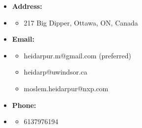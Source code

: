 \documentclass[12pt,oneside]{book}
\begin{document}
\begin {itemize}
\item  [] {\bf  Address:} \vspace{-1.5em}
\item []  {\bf \hrulefill } \vspace{-1em}
\begin {itemize} 
\item  \small 217 Big Dipper, Ottawa, ON, Canada
\end{itemize}  \vspace{0.5em}
\item  []  {\bf  Email:} \vspace{-1.5em}
\item []  {\bf \hrulefill } \vspace{-1em}
\begin {itemize} 
 \item  \small heidarpur.m@gmail.com (preferred)
 \item \small heidarp@uwindsor.ca
 \item \small moslem.heidarpur@nxp.com
\end {itemize}   \vspace{0.5em}
\item  []   {\bf Phone:} \vspace{-1.5em}
\item []  {\bf \hrulefill } \vspace{-1em}
\begin {itemize} 
\item 6137976194
\end{itemize}
\end{itemize}

\newpage 
 
\newpage


\newpage

\newpage

\newpage

\newpage

\newpage




\newpage

%

%
\newpage

\newpage
 
 
  
  
    
 
 
\end{document}
